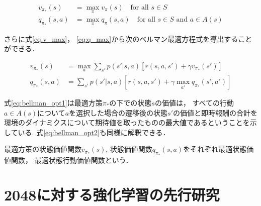 \begin{align}
  \label{eq:v_max}
  v_{\pi_*}(s) &= \max_\pi v_{\pi}(s) \quad \text{for all } s \in S \\
  \label{eq:q_max}
  q_{\pi_*}(s,a) &= \max_\pi q_{\pi}(s, a) \quad \text{for all } s \in S \text{ and } a \in A(s)
\end{align}

さらに式\ref{eq:v_max}， \ref{eq:q_max}から次のベルマン最適方程式を導出することができる．

\begin{align}
  \label{eq:bellman_opt1}
  v_{\pi_*}(s) &= \max_a \sum_{s'}p(s'|s,a)[r(s,a,s') + \gamma v_{\pi_*}(s')] \\
  \label{eq:bellman_opt2}
  q_{\pi_*}(s,a) &= \sum_{s'}p(s'|s,a)[r(s,a,s') +\gamma \max_{a'}q_{\pi_*}(s',a')]
\end{align}

式\ref{eq:bellman_opt1}は最適方策$\pi_*$の下での状態$s$の価値は， すべての行動$a \in A(s)$について$a$を選択した場合の遷移後の状態$s'$の価値と即時報酬の合計を環境のダイナミクスについて期待値を取ったものの最大値であるということを示している.
式\ref{eq:bellman_opt2}も同様に解釈できる．

最適方策の状態価値関数$v_{\pi_*}(s)$, 状態価値関数$q_{\pi_*}(s,a)$をそれぞれ最適状態価値関数， 最適状態行動価値関数という．

\section{2048に対する強化学習の先行研究}